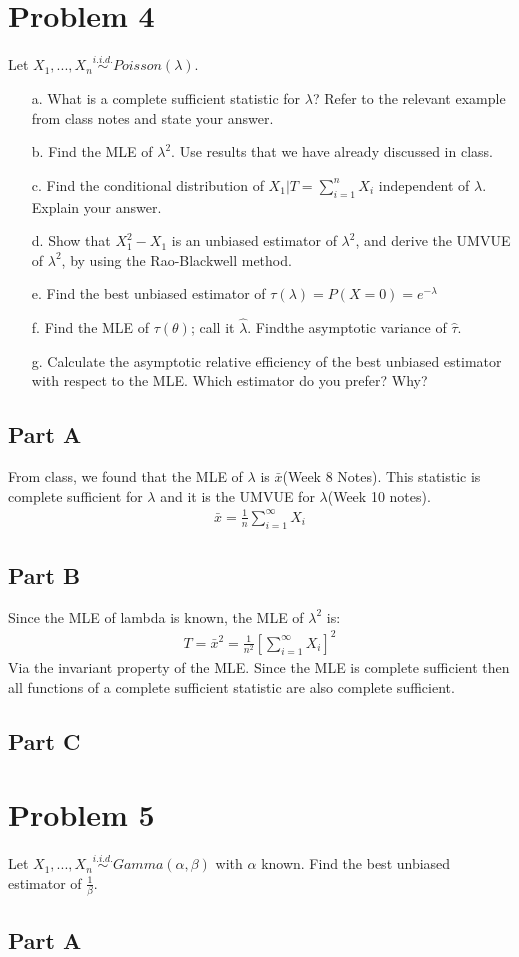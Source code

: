 \documentclass{article}
\begin{document}
\section*{Problem 4}
Let $X_1,...,X_n \overset{i.i.d.}{\sim} Poisson(\lambda)$.
\begin{enumerate}
\item[a.] What is a complete sufficient statistic for $\lambda$? Refer to the relevant example from class notes and state your answer.
\item[b.] Find the MLE of $\lambda^2$. Use results that we have already discussed in class.
\item[c.] Find the conditional distribution of $X_1|T=\sum_{i=1}^{n}X_i$ independent of $\lambda$. Explain your answer.
\item[d.] Show that $X^2_1-X_1$ is an unbiased estimator of $\lambda^2$, and derive the UMVUE of $\lambda^2$, by using the Rao-Blackwell method.
\item[e.] Find the best unbiased estimator of $\tau(\lambda) = P(X=0)= e^{-\lambda}$
\item[f.] Find the MLE of $\tau(\theta)$; call it $\hat{\lambda}$. Findthe asymptotic variance of $\hat{\tau}$.
\item[g.] Calculate the asymptotic relative efficiency of the best unbiased estimator with respect to the MLE. Which estimator do you prefer? Why?
\end{enumerate}
\subsection*{Part A}
From class, we found that the MLE of $\lambda$ is $\bar{x}$(Week 8 Notes). This statistic is complete sufficient for $\lambda$ and it is the UMVUE for $\lambda$(Week 10 notes).
\begin{align*}
\boxed{ \bar{x} = \frac{1}{n} \sum_{i=1}^{\infty} X_i  }
\end{align*}

\subsection*{Part B}
Since the MLE of lambda is known, the MLE of $\lambda^2$ is:
\begin{align*}
\boxed{ T = \bar{x}^2 = \frac{1}{n^2} [\sum_{i=1}^{\infty} X_i]^2  }
\end{align*}
Via the invariant property of the MLE. Since the MLE is complete sufficient then all functions of a complete sufficient statistic are also complete sufficient.

\subsection*{Part C}

\clearpage

\section*{Problem 5}
Let $X_1,...,X_n \overset{i.i.d.}{\sim} Gamma(\alpha,\beta)$  with $\alpha$ known. Find the best unbiased estimator of $\frac{1}{\beta}$.

\subsection*{Part A}


\clearpage
\end{document}
